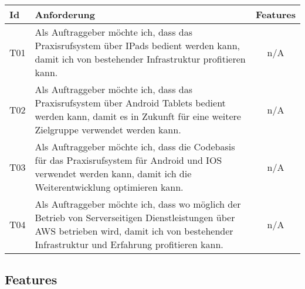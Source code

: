 \begin{table}[h]
    \centering
    \begin{tabular}{|l|p{13cm}|c|}
        \hline
        \textbf{Id} & \textbf{Anforderung}                                                                                                                                                                          & \textbf{Features} \\
        \hline
        T01         & Als Auftraggeber möchte ich, dass das Praxisrufsystem über IPads bedient werden kann, damit ich von bestehender Infrastruktur profitieren kann. & n/A \\
        \hline
        T02         & Als Auftraggeber möchte ich, dass das Praxisrufsystem über Android Tablets bedient werden kann, damit es in Zukunft für eine weitere Zielgruppe verwendet werden kann. & n/A \\
        \hline
        T03         & Als Auftraggeber möchte ich, dass die Codebasis für das Praxisrufsystem für Android und IOS verwendet werden kann, damit ich die Weiterentwicklung optimieren kann. & n/A \\
        \hline
        T04         & Als Auftraggeber möchte ich, dass wo möglich der Betrieb von Serverseitigen Dienstleistungen über AWS betrieben wird, damit ich von bestehender Infrastruktur und Erfahrung profitieren kann. & n/A               \\
        \hline
    \end{tabular}\label{tab:userstories3}
\end{table}

\clearpage

\subsection{Features}\label{subsec:features}

